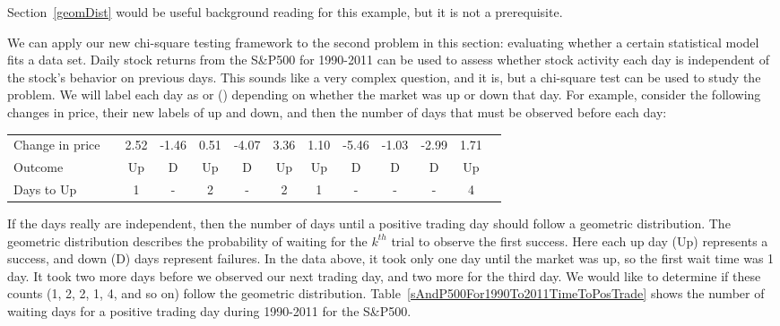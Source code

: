 Section~\ref{geomDist} would be useful background reading for this example, but it is not a prerequisite.


We can apply our new chi-square testing framework to the second problem in this section: evaluating whether a certain statistical model fits a data set. Daily stock returns from the S\&P500 for 1990-2011 can be used to assess whether stock activity each day is independent of the stock's behavior on previous days. This sounds like a very complex question, and it is, but a chi-square test can be used to study the problem. We will label each day as  or  () depending on whether the market was up or down that day. For example, consider the following changes in price, their new labels of up and down, and then the number of days that must be observed before each  day:
\begin{center}\footnotesize
\begin{tabular}{lc ccc ccc ccc cc}
Change in price		&\hspace{-1mm}	& \footnotesize2.52 &
	\footnotesize-1.46 & \footnotesize 0.51 &
	\footnotesize-4.07 & \footnotesize3.36 &
	\footnotesize1.10 &
	\footnotesize-5.46 & \footnotesize-1.03 & \footnotesize-2.99 & \footnotesize1.71 \\
Outcome	 & \hspace{-1mm} &
	Up &
	D & Up &
	D & Up &
	Up &
	D & D & D & Up \\
\footnotesize Days to Up & \hspace{-1mm} & 1 & - & 2 & - & 2 & 1 & - & - & - & 4 \\
\end{tabular}
\end{center}
If the days really are independent, then the number of days until a positive trading day should follow a geometric distribution. The geometric distribution describes the probability of waiting for the $k^{th}$ trial to observe the first success. Here each up day (Up) represents a success, and down (D) days represent failures. In the data above, it took only one day until the market was up, so the first wait time was 1 day. It took two more days before we observed our next  trading day, and two more for the third  day. We would like to determine if these counts (1, 2, 2, 1, 4, and so on) follow the geometric distribution. Table~\ref{sAndP500For1990To2011TimeToPosTrade} shows the number of waiting days for a positive trading day during 1990-2011 for the S\&P500.


